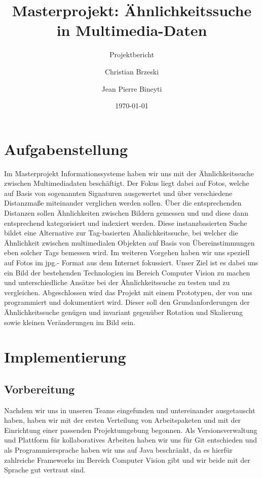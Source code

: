\documentclass{scrartcl}
\title{Masterprojekt: Ähnlichkeitssuche in Multimedia-Daten}
\subtitle{Projektbericht}
\author{Christian Brzeski \and Jean Pierre Bineyti}
\date{\today}
\begin{document}
\maketitle

\section{Aufgabenstellung}
Im Masterprojekt Informationssysteme haben wir uns mit der Ähnlichkeitssuche zwischen Multimediadaten beschäftigt. Der Fokus liegt dabei auf Fotos, welche auf Basis von sogenannten Signaturen ausgewertet und über verschiedene Distanzmaße miteinander verglichen werden sollen. Über die entsprechenden Distanzen sollen Ähnlichkeiten zwischen Bildern gemessen und und diese dann entsprechend kategorisiert und indexiert werden. Diese instanzbasierten Suche bildet eine Alternative zur Tag-basierten Ähnlichkeitssuche, bei welcher die Ähnlichkeit zwischen multimedialen Objekten auf Basis von Übereinstimmungen eben solcher Tags bemessen wird. Im weiteren Vorgehen haben wir uns speziell auf Fotos im jpg.- Format aus dem Internet fokussiert. Unser Ziel ist es dabei uns ein Bild der bestehenden Technologien im Bereich Computer Vision zu machen und unterschiedliche Ansätze bei der Ähnlichkeitssuche zu testen und zu vergleichen. Abgeschlossen wird das Projekt mit einem Prototypen, der von uns programmiert und dokumentiert wird. Dieser soll den Grundanforderungen der Ähnlichkeitssuche genügen und invariant gegenüber Rotation und Skalierung sowie kleinen Veränderungen im Bild sein.

\section{Implementierung}

\subsection{Vorbereitung}

Nachdem wir uns in unseren Teams eingefunden und untereinander ausgetauscht haben, haben wir mit der ersten Verteilung von Arbeitspaketen und mit der Einrichtung einer passenden Projektumgebung begonnen. Als Versionsverwaltung und Plattform für kollaboratives Arbeiten haben wir uns für Git entschieden und als Programmiersprache haben wir uns auf Java beschränkt, da es hierfür zahlreiche Frameworks im Bereich Computer Vision gibt und wir beide mit der Sprache gut vertraut sind. 
\\
\end{document}
